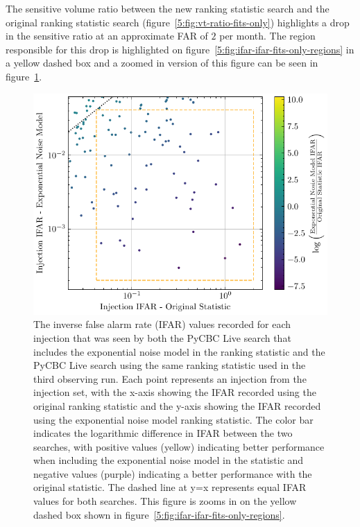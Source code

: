 The sensitive volume ratio between the new ranking statistic search and the original ranking statistic search (figure~\ref{5:fig:vt-ratio-fits-only}) highlights a drop in the sensitive ratio at an approximate FAR of $2$ per month. The region responsible for this drop is highlighted on figure~\ref{5:fig:ifar-ifar-fits-only-regions} in a yellow dashed box and a zoomed in version of this figure can be seen in figure~\ref{5:fig:bottom-left-region}.
%
\begin{figure}
    \centering
    \includegraphics[width=1\textwidth]{images/5_pycbclive/regions/fits_only_ifar_vs_ifar_bottom_left_region.pdf}
    \caption{The inverse false alarm rate (IFAR) values recorded for each injection that was seen by both the PyCBC Live search that includes the exponential noise model in the ranking statistic and the PyCBC Live search using the same ranking statistic used in the third observing run. Each point represents an injection from the injection set, with the x-axis showing the IFAR recorded using the original ranking statistic and the y-axis showing the IFAR recorded using the exponential noise model ranking statistic. The color bar indicates the logarithmic difference in IFAR between the two searches, with positive values (yellow) indicating better performance when including the exponential noise model in the statistic and negative values (purple) indicating a better performance with the original statistic. The dashed line at y=x represents equal IFAR values for both searches. This figure is zooms in on the yellow dashed box shown in figure~\ref{5:fig:ifar-ifar-fits-only-regions}.}
    \label{5:fig:bottom-left-region}
\end{figure}
